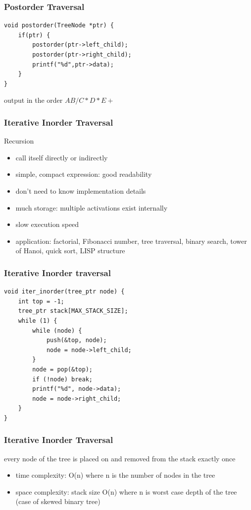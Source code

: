 \documentclass[newPxFont,sthlmFooter,nooffset]{beamer}
\begin{document}
\begin{frame}[t, fragile]
  \frametitle{Postorder Traversal}
\begin{lstlisting}
void postorder(TreeNode *ptr) { 
    if(ptr) {
        postorder(ptr->left_child); 
        postorder(ptr->right_child);
        printf("%d",ptr->data); 
    } 
}  
\end{lstlisting}

output in the order $AB/C*D*E+$

\end{frame}


\begin{frame}[t]
  \frametitle{Iterative Inorder Traversal}
Recursion
\begin{itemize}
\item call itself directly or indirectly
\item simple, compact expression: good
readability
\item don’t need to know implementation
details
\item much storage: multiple activations
exist internally
\item  slow execution speed
\item  application: factorial, Fibonacci
number, tree traversal, binary search, tower of Hanoi, quick sort, LISP structure
\end{itemize}
\end{frame}


\begin{frame}[t, fragile]
  \frametitle{Iterative Inorder traversal}
  \begin{lstlisting}
void iter_inorder(tree_ptr node) { 
    int top = -1;
    tree_ptr stack[MAX_STACK_SIZE]; 
    while (1) {
        while (node) {
            push(&top, node);
            node = node->left_child;
        }
        node = pop(&top);
        if (!node) break; 
        printf("%d", node->data); 
        node = node->right_child;
    } 
}    
  \end{lstlisting}
\end{frame}


\begin{frame}[t]
  \frametitle{Iterative Inorder Traversal}
every node of the tree is placed on and removed from the stack exactly once

\begin{itemize}
\item time complexity: O(n) where n is the number of nodes in the tree
\item space complexity: stack size O(n) where n is worst case depth of the
  tree (case of skewed binary tree)
\end{itemize}

\end{frame}
\end{document}
